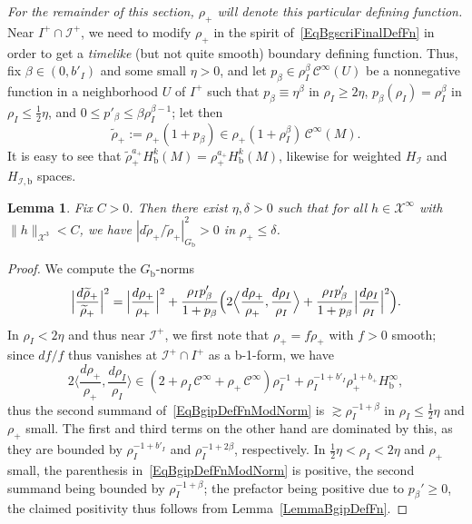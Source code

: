 \documentclass[reqno,11pt,letterpaper]{amsart}
\numberwithin{equation}{section}
\numberwithin{figure}{section}
\newtheorem{lemma}[thm]{Lemma}
\theoremstyle{definition}
\theoremstyle{remark}
\newcommand{\mc}{\mathcal}
\newcommand{\cC}{\mc C}
\newcommand{\cX}{\mc X}
\newcommand{\ms}{\mathscr}
\newcommand{\scri}{\ms I}
\newcommand{\ringrho}{\mathring\rho}
\newcommand{\la}{\langle}
\newcommand{\ra}{\rangle}
\newcommand{\wt}{\widetilde}
\newcommand{\bop}{{\mathrm{b}}}
\newcommand{\half}{\tfrac{1}{2}}
\newcommand{\CI}{\cC^\infty}
\newcommand{\Hb}{H_{\bop}}
\newcommand{\Hscri}{H_{\scri}}
\newcommand{\Hscrib}{H_{\scri,\bop}}
\begin{document}
\emph{For the remainder of this section, $\rho_+$ will denote this particular defining function.} Near $I^+\cap\scri^+$, we need to modify $\rho_+$ in the spirit of~\eqref{EqBgscriFinalDefFn} in order to get a \emph{timelike} (but not quite smooth) boundary defining function. Thus, fix $\beta\in(0,b'_I)$ and some small $\eta>0$, and let $p_\beta\in\rho_I^\beta\,\CI(U)$ be a nonnegative function in a neighborhood $U$ of $I^+$ such that $p_\beta\equiv\eta^\beta$ in $\rho_I\geq 2\eta$, $p_\beta(\rho_I)=\rho_I^\beta$ in $\rho_I\leq\half\eta$, and $0\leq p'_\beta\leq\beta\rho_I^{\beta-1}$; let then
\begin{equation}
\label{EqBgipDefFnMod}
  \wt\rho_+ := \rho_+(1+p_\beta) \in \rho_+(1+\rho_I^\beta)\,\CI(M).
\end{equation}
It is easy to see that $\wt\rho_+^{a_+}\Hb^k(M)=\rho_+^{a_+}\Hb^k(M)$, likewise for weighted $\Hscri$ and $\Hscrib$ spaces.

\begin{lemma}
  Fix $C>0$. Then there exist $\eta,\delta>0$ such that for all $h\in\cX^\infty$ with $\|h\|_{\cX^3}<C$, we have $|d\wt\rho_+/\wt\rho_+|_{G_\bop}^2>0$ in $\rho_+\leq\delta$.
\end{lemma}
\begin{proof}
  We compute the $G_\bop$-norms
  \begin{equation}
  \label{EqBgipDefFnModNorm}
    \Bigl|\frac{d\wt\rho_+}{\wt\rho_+}\Bigr|^2 = \Bigl|\frac{d\rho_+}{\rho_+}\Bigr|^2 + \frac{\rho_I p_\beta'}{1+p_\beta}\Bigl(2\Big\la\frac{d\rho_+}{\rho_+},\frac{d\rho_I}{\rho_I}\Big\ra + \frac{\rho_Ip_\beta'}{1+p_\beta}\Bigl|\frac{d\rho_I}{\rho_I}\Bigr|^2\Bigr).
  \end{equation}
  In $\rho_I<2\eta$ and thus near $\scri^+$, we first note that $\rho_+=f\ringrho_+$ with $f>0$ smooth; since $d f/f$ thus vanishes at $\scri^+\cap I^+$ as a b-1-form, we have
  \[
    2\Big\la\frac{d\rho_+}{\rho_+},\frac{d\rho_I}{\rho_I}\Big\ra \in (2+\rho_I\,\CI+\rho_+\,\CI)\rho_I^{-1} + \rho_I^{-1+b'_I}\rho_+^{1+b_+}\Hb^\infty,
  \]
  thus the second summand of~\eqref{EqBgipDefFnModNorm} is $\gtrsim\rho_I^{-1+\beta}$ in $\rho_I\leq\half\eta$ and $\rho_+$ small. The first and third terms on the other hand are dominated by this, as they are bounded by $\rho_I^{-1+b'_I}$ and $\rho_I^{-1+2\beta}$, respectively. In $\half\eta<\rho_I<2\eta$ and $\rho_+$ small, the parenthesis in~\eqref{EqBgipDefFnModNorm} is positive, the second summand being bounded by $\rho_I^{-1+\beta}$; the prefactor being positive due to $p_\beta'\geq 0$, the claimed positivity thus follows from Lemma~\ref{LemmaBgipDefFn}.
\end{proof}
\end{document}
